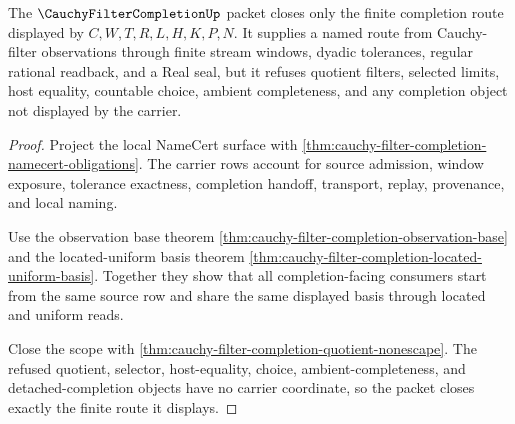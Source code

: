 \begin{theorem}
\label{thm:cauchy-filter-completion-completion-scope}
The $\CauchyFilterCompletionUp$ packet closes only the finite completion route displayed by $C,W,T,R,L,H,K,P,N$. It supplies a named route from Cauchy-filter observations through finite stream windows, dyadic tolerances, regular rational readback, and a Real seal, but it refuses quotient filters, selected limits, host equality, countable choice, ambient completeness, and any completion object not displayed by the carrier.
\end{theorem}
\begin{proof}
Project the local NameCert surface with \autoref{thm:cauchy-filter-completion-namecert-obligations}. The carrier rows account for source admission, window exposure, tolerance exactness, completion handoff, transport, replay, provenance, and local naming.

Use the observation base theorem \autoref{thm:cauchy-filter-completion-observation-base} and the located-uniform basis theorem \autoref{thm:cauchy-filter-completion-located-uniform-basis}. Together they show that all completion-facing consumers start from the same source row and share the same displayed basis through located and uniform reads.

Close the scope with \autoref{thm:cauchy-filter-completion-quotient-nonescape}. The refused quotient, selector, host-equality, choice, ambient-completeness, and detached-completion objects have no carrier coordinate, so the packet closes exactly the finite route it displays.
\end{proof}
